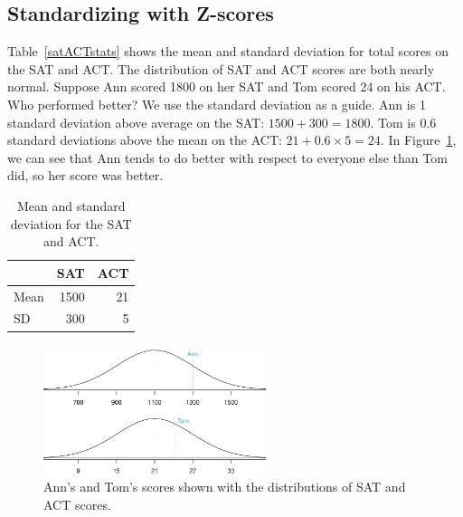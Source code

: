 \subsection{Standardizing with Z-scores}

\begin{examplewrap}
\begin{nexample}{Table~\vref{satACTstats} shows the mean and standard deviation for total scores on the SAT and ACT. The distribution of SAT and ACT scores are both nearly normal. Suppose Ann scored 1800 on her SAT and Tom scored 24 on his ACT. Who performed better?}\label{actSAT}
We use the standard deviation as a guide. Ann is 1 standard deviation above average on the SAT: $1500 + 300=1800$. Tom is 0.6 standard deviations above the mean on the ACT: $21+0.6\times 5=24$. In Figure~\ref{satActNormals}, we can see that Ann tends to do better with respect to everyone else than Tom did, so her score was better.
\end{nexample}
\end{examplewrap}

\begin{table}
\centering
\begin{tabular}{l r r}
  \hline
  & SAT & ACT \\
  \hline
Mean \hspace{0.3cm} & 1500 & 21 \\
SD & 300 & 5 \\
   \hline
\end{tabular}
\caption{Mean and standard deviation for the SAT and ACT.}
\label{satACTstats}
\end{table}

\begin{figure}
\centering
\includegraphics[width=65mm]{ch_distributions/figures/satActNormals/satActNormals}
\caption{Ann's and Tom's scores shown with the distributions of SAT and ACT scores.}
\label{satActNormals}
\end{figure}

